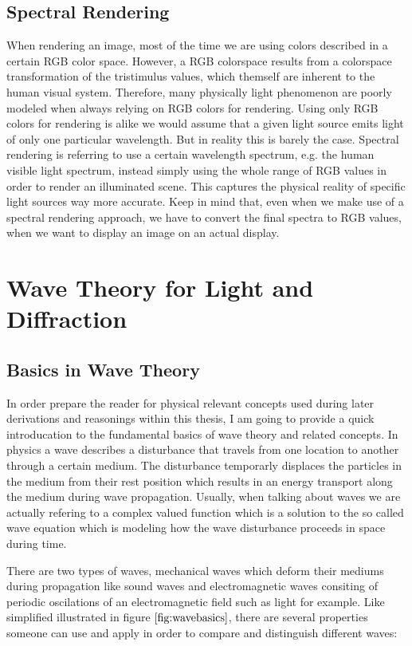 \subsection{Spectral Rendering}
When rendering an image, most of the time we are using colors described in a certain RGB color space. However, a RGB colorspace results from a colorspace transformation of the tristimulus values, which themself are inherent to the human visual system. Therefore, many physically light phenomenon are poorly modeled when always relying on RGB colors for rendering. Using only RGB colors for rendering is alike we would assume that a given light source emits light of only one particular wavelength. But in reality this is barely the case. Spectral rendering is referring to use a certain wavelength spectrum, e.g. the human visible light spectrum, instead simply using the whole range of RGB values in order to render an illuminated scene. This captures the physical reality of specific light sources way more accurate. Keep in mind that, even when we make use of a spectral rendering approach, we have to convert the final spectra to RGB values, when we want to display an image on an actual display. 

\section{Wave Theory for Light and Diffraction}
\subsection{Basics in Wave Theory}
In order prepare the reader for physical relevant concepts used during later derivations and reasonings within this thesis, I am going to provide a quick introducation to the fundamental basics of wave theory and related concepts. In physics a wave describes a disturbance that travels from one location to another through a certain medium. The disturbance temporarly displaces the particles in the medium from their rest position which results in an energy transport along the medium during wave propagation. Usually, when talking about waves we are actually refering to a complex valued function which is a solution to the so called wave equation which is modeling how the wave disturbance proceeds in space during time. 

There are two types of waves, mechanical waves which deform their mediums during propagation like sound waves and electromagnetic waves consiting of periodic oscilations of an electromagnetic field such as light for example. Like simplified illustrated in figure $\ref{fig:wavebasics}$, there are several properties someone can use and apply in order to compare and distinguish different waves:

